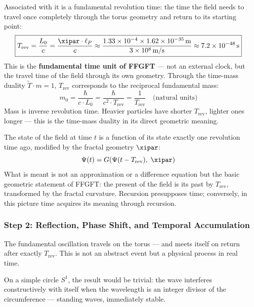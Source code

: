Associated with it is a fundamental revolution time: the time the field needs
to travel once completely through the torus geometry and return to its starting point:
\begin{equation}
    \boxed{T_\text{rev} = \frac{L_0}{c} = \frac{\xipar \cdot \ell_P}{c}
    \approx \frac{1.33 \times 10^{-4} \times 1.62 \times 10^{-35}\,\text{m}}{3 \times 10^8\,\text{m/s}}
    \approx 7.2 \times 10^{-48}\,\text{s}}
    \label{eq:Trev}
\end{equation}
This is the \textbf{fundamental time unit of FFGFT} — not an external clock,
but the travel time of the field through its own geometry. Through the time-mass
duality $\tilde{T} \cdot m = 1$, $T_\text{rev}$ corresponds to the reciprocal
fundamental mass:
\begin{equation}
    m_0 = \frac{\hbar}{c \cdot L_0} = \frac{\hbar}{c^2 \cdot T_\text{rev}}
    = \frac{1}{T_\text{rev}} \quad \text{(natural units)}
\end{equation}
Mass is inverse revolution time. Heavier particles have shorter $T_\text{rev}$,
lighter ones longer — this is the time-mass duality in its direct geometric meaning.

\begin{foundation}
The state of the field at time $t$ is a function of its state exactly one
revolution time ago, modified by the fractal geometry $\xipar$:
\begin{equation}
    \Psi(t) = G\!\left(\Psi(t - T_\text{rev}),\; \xipar\right)
    \label{eq:recursion}
\end{equation}
What is meant is not an approximation or a difference equation but the basic
geometric statement of FFGFT: the present of the field is its past by $T_\text{rev}$,
transformed by the fractal curvature. Recursion presupposes time; conversely, in
this picture time acquires its meaning through recursion.
\end{foundation}

\subsubsection*{Step 2: Reflection, Phase Shift, and Temporal Accumulation}

The fundamental oscillation travels on the torus — and meets itself on return
after exactly $T_\text{rev}$. This is not an abstract event but a physical process
in real time.

On a simple circle $S^1$, the result would be trivial: the wave interferes
constructively with itself when the wavelength is an integer divisor of the
circumference — standing waves, immediately stable.

